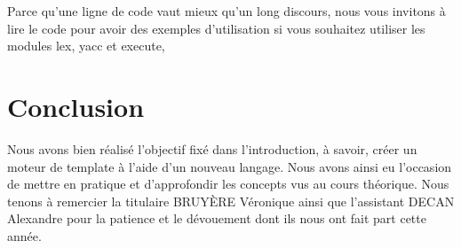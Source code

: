 \documentclass[10pt,a4paper]{article}
\begin{document}
	Parce qu'une ligne de code vaut mieux qu'un long discours, nous vous invitons à lire le code pour avoir des exemples d'utilisation si vous souhaitez utiliser les modules lex, yacc et execute, 
	
	\newpage
	\section{Conclusion}
	Nous avons bien réalisé l'objectif fixé dans l'introduction, à savoir, créer un moteur de template à l'aide d'un nouveau langage.
	Nous avons ainsi eu l'occasion de mettre en pratique et d'approfondir les concepts vus au cours théorique.
	Nous tenons à remercier la titulaire BRUYÈRE Véronique ainsi que l'assistant DECAN Alexandre pour la patience et le dévouement dont ils nous ont fait part cette année.
	
\end{document}
